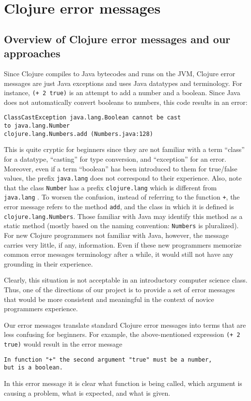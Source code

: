 \documentclass[12pt]{article}
\begin{document}
	


\section{Clojure error messages}
\subsection{Overview of Clojure error messages and our approaches}
Since Clojure compiles to Java bytecodes and runs on the JVM, Clojure error messages are just Java exceptions
and uses Java datatypes and terminology. 
For instance, {\tt (+ 2 true)} is an attempt to add a number and a boolean. 
Since Java does not automatically convert booleans to numbers, this code results in an error:
\begin{verbatim}
ClassCastException java.lang.Boolean cannot be cast 
to java.lang.Number  
clojure.lang.Numbers.add (Numbers.java:128)
\end{verbatim} 
This is quite cryptic for beginners since they are not familiar with a term ``class'' for a datatype,
``casting'' for type conversion, and ``exception'' for an error. Moreover, even if a term ``boolean'' 
has been introduced to them for true/false values, the prefix {\tt  java.lang} does not 
correspond to their experience. Also, note that the class {\tt Number} has a prefix {\tt  clojure.lang}
which is different from {\tt  java.lang} . To worsen the confusion, instead of referring
to the function {\tt +}, the error message refers to the method {\tt add}, and the class 
in which it is defined is {\tt clojure.lang.Numbers}. Those familiar with Java may identify this
method as a static method (mostly based on the naming convention: {\tt Numbers} is pluralized). 
For new Clojure programmers not familiar with Java, however, the message carries very little, if any, information. 
Even if these new programmers memorize common error messages terminology after a while, 
it would still not have any grounding in their experience. 

Clearly, this situation is not acceptable in an introductory computer science class. Thus, one of the directions of our project is to 
provide a set of error messages that would be more consistent and meaningful in the context of 
novice programmers experience. 

Our error messages translate standard Clojure error messages into terms that are less confusing for beginners. 
For example, the above-mentioned expression  {\tt (+ 2 true)} would result in the error message
\begin{verbatim}
In function "+" the second argument "true" must be a number, 
but is a boolean. 
\end{verbatim} 
In this error message it is clear what function is being called, which argument is causing a problem, 
what is expected, and what is given. 
\end{document}
